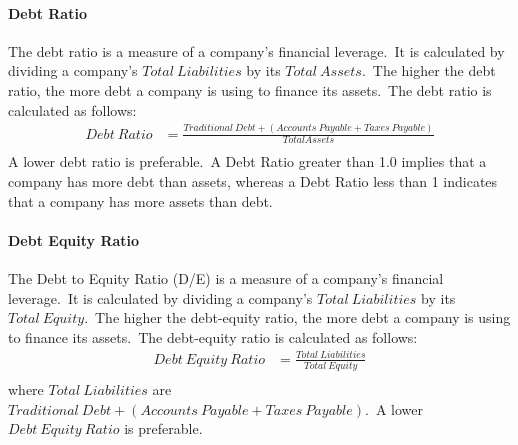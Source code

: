 \documentclass[../xlapes02]{subfiles}
\begin{document}
    \paragraph{Debt Ratio}\label{par:debt-ratio}
    The debt ratio is a measure of a company's financial leverage.\ It is calculated by dividing a company's $Total\ Liabilities$ by its $Total\ Assets$.\ The higher the debt ratio, the more debt a company is using to finance its assets.\ The debt ratio is calculated as follows:
    \begin{equation}
        \label{eq:debt-ratio}
        \begin{split}
            Debt\ Ratio&=\frac{Traditional\ Debt+(Accounts\ Payable+Taxes\ Payable)}{Total Assets}\\
        \end{split}
    \end{equation}
    A lower debt ratio is preferable.\ A Debt Ratio greater than 1.0 implies that a company has more debt than assets, whereas a Debt Ratio less than 1 indicates that a company has more assets than debt.

    \paragraph{Debt Equity Ratio}\label{par:debt-equity-ratio}
    The Debt to Equity Ratio (D/E) is a measure of a company's financial leverage.\ It is calculated by dividing a company's $Total\ Liabilities$ by its $Total\ Equity$.\ The higher the debt-equity ratio, the more debt a company is using to finance its assets.\ The debt-equity ratio is calculated as follows:
    \begin{equation}
        \label{eq:debt-equity-ratio}
        \begin{split}
            Debt\ Equity\ Ratio&=\frac{Total\ Liabilities}{Total\ Equity}\\
        \end{split}
    \end{equation}
    where $Total\ Liabilities$ are $Traditional\ Debt+(Accounts\ Payable+Taxes\ Payable)$.\ A lower $Debt\ Equity\ Ratio$ is preferable.
\end{document}
